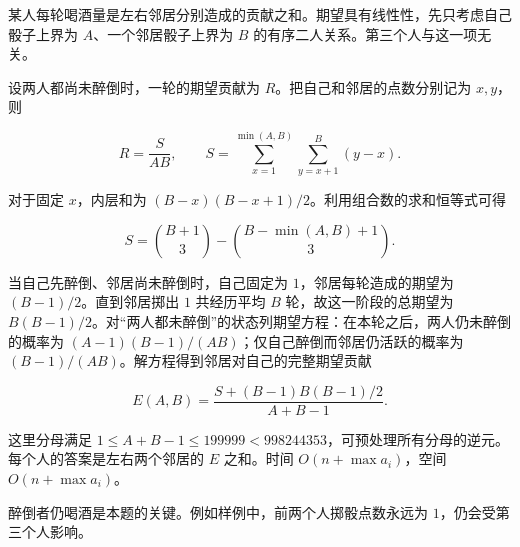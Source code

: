 \Legend
某人每轮喝酒量是左右邻居分别造成的贡献之和。期望具有线性性，先只考虑自己骰子上界为 $A$、一个邻居骰子上界为 $B$ 的有序二人关系。第三个人与这一项无关。

设两人都尚未醉倒时，一轮的期望贡献为 $R$。把自己和邻居的点数分别记为 $x,y$，则

$$R=\frac{S}{AB},\qquad S=\sum_{x=1}^{\min(A,B)}\sum_{y=x+1}^{B}(y-x).$$

对于固定 $x$，内层和为 $(B-x)(B-x+1)/2$。利用组合数的求和恒等式可得

$$S={B+1\choose3}-{B-\min(A,B)+1\choose3}.$$

当自己先醉倒、邻居尚未醉倒时，自己固定为 $1$，邻居每轮造成的期望为 $(B-1)/2$。直到邻居掷出 $1$ 共经历平均 $B$ 轮，故这一阶段的总期望为 $B(B-1)/2$。对“两人都未醉倒”的状态列期望方程：在本轮之后，两人仍未醉倒的概率为 $(A-1)(B-1)/(AB)$；仅自己醉倒而邻居仍活跃的概率为 $(B-1)/(AB)$。解方程得到邻居对自己的完整期望贡献

$$E(A,B)=\frac{S+(B-1)B(B-1)/2}{A+B-1}.$$

这里分母满足 $1\le A+B-1\le 199999<998244353$，可预处理所有分母的逆元。每个人的答案是左右两个邻居的 $E$ 之和。时间 $O(n+\max a_i)$，空间 $O(n+\max a_i)$。

醉倒者仍喝酒是本题的关键。例如样例中，前两个人掷骰点数永远为 $1$，仍会受第三个人影响。
